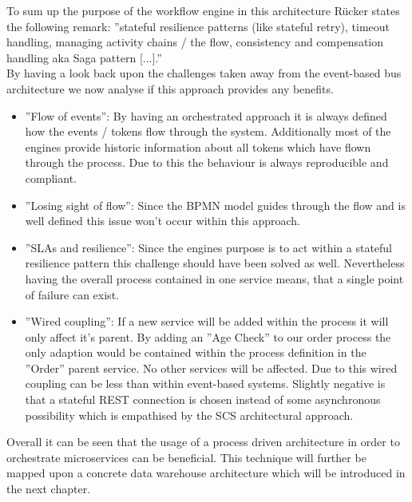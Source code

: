 To sum up the purpose of the workflow engine in this architecture Rücker states the following remark: ''stateful resilience patterns (like stateful retry), timeout handling, managing activity chains / the flow, consistency and compensation handling aka Saga pattern [...].'' \cite{orchestrationMicroServices}\newline
\\
By having a look back upon the challenges taken away from the event-based bus architecture we now analyse if this approach provides any benefits. 
\begin{itemize}
    \item ''Flow of events'': By having an orchestrated approach it is always defined how the events / tokens flow through the system. Additionally most of the engines provide historic information about all tokens which have flown through the process. Due to this the behaviour is always reproducible and compliant. 
    \item ''Losing sight of flow'': Since the BPMN model guides through the flow and is well defined this issue won't occur within this approach.
    \item ''SLAs and resilience'': Since the engines purpose is to act within a stateful resilience pattern this challenge should have been solved as well. Nevertheless having the overall process contained in one service means, that a single point of failure can exist. 
    \item ''Wired coupling'': If a new service will be added within the process it will only affect it's parent. By adding an ''Age Check'' to our order process the only adaption would be contained within the process definition in the ''Order'' parent service. No other services will be affected. Due to this wired coupling can be less than within event-based systems. Slightly negative is that a stateful REST connection is chosen instead of some asynchronous possibility which is empathised by the SCS architectural approach. 
\end{itemize}
Overall it can be seen that the usage of a process driven architecture in order to orchestrate microservices can be beneficial. This technique will further be mapped upon a concrete data warehouse architecture which will be introduced in the next chapter. 
